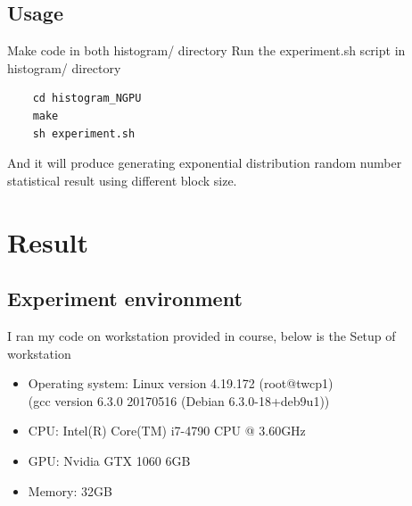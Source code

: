 \documentclass{article}
\begin{document}
	
	\subsection{Usage}
	Make code in both histogram/ directory
	Run the experiment.sh script in histogram/ directory 
	
	\begin{verbatim}
	cd histogram_NGPU
	make
	sh experiment.sh
	\end{verbatim}
	
	And it will produce generating exponential distribution random number statistical result using different block size.

	\section{Result}
	\subsection{Experiment environment}
	I ran my code on workstation provided in course, below is the Setup of workstation
	\begin{itemize}
		\item Operating system: Linux version 4.19.172 (root@twcp1)\\(gcc version 6.3.0 20170516 (Debian 6.3.0-18+deb9u1))
		\item CPU: Intel(R) Core(TM) i7-4790 CPU @ 3.60GHz
		\item GPU: Nvidia GTX 1060 6GB
		\item Memory: 32GB 
	\end{itemize}
\end{document}
